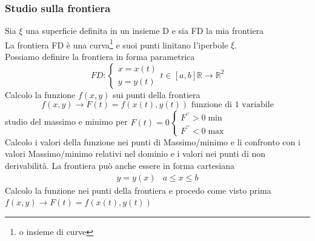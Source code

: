 \documentclass{book}
\begin{document}
\subsubsection{Studio sulla frontiera}
Sia $\xi$ una superficie definita in un insieme D e sia FD la mia frontiera\\
La frontiera FD è una curva\footnote{o insieme di curve} e suoi punti linitano
l'iperbole $\xi$.\\
Possiamo definire la frontiera in forma parametrica
\begin{equation*}
	FD:\begin{cases}
		x=x(t)\\
		y=y(t)
	\end{cases} t\in [a,b] \mathds{R}\to \mathds{R}^2
\end{equation*}
Calcolo la funzione $f(x,y)$ sui punti della frontiera
\begin{equation}
	f(x,y)\to F(t)=f(x(t),y(t))\text{ funzione di 1 variabile}
\end{equation}
studio del massimo e minimo per $F(t)=0\begin{cases}
	F^{\prime\prime}>0 \min\\
	F^{\prime\prime}<0 \max
\end{cases}$\\
Calcolo i valori della funzione nei punti di Massimo/minimo e li confronto con
i valori Massimo/minimo relativi nel dominio e i valori nei punti di non
derivabilità. La frontiera può anche essere in forma cartesiana
\begin{equation}
	\begin{matrix}
		y=y(x) & a\leq x\leq b
	\end{matrix}
\end{equation}
Calcolo la funzione nei punti della frontiera e procedo come visto prima
$f(x,y)\to F(t)=f(x(t),y(t))$
\end{document}
